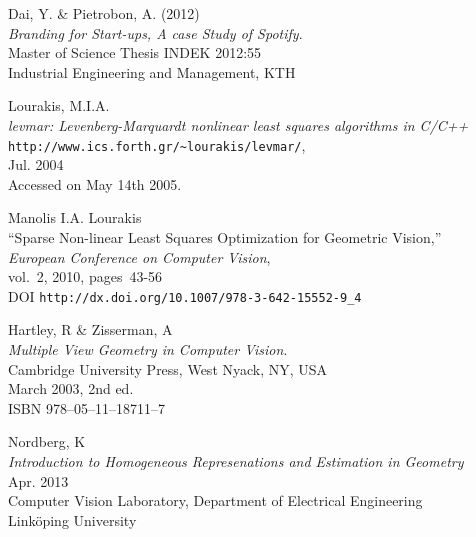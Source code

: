 \begin{thebibliography}{9}

	Dai, Y. \& Pietrobon, A. (2012)\\
	\emph{Branding for Start-ups, A case Study of Spotify}.\\
	Master of Science Thesis INDEK 2012:55 \\
	Industrial Engineering and Management, KTH
	

    Lourakis, M.I.A.\\
   \emph{levmar: Levenberg-Marquardt nonlinear least squares algorithms in {C}/{C}++}\\
     \verb+http://www.ics.forth.gr/~lourakis/levmar/+,\\
    Jul. 2004\\
    Accessed on May 14th 2005.
    
    Manolis I.A. Lourakis\\
   ``Sparse Non-linear Least Squares Optimization for Geometric Vision,''\\
    \emph{European Conference on Computer Vision},\\
    vol.~2, 2010,
    pages~43-56 \\
    DOI \verb+http://dx.doi.org/10.1007/978-3-642-15552-9_4+

	Hartley, R \& Zisserman, A\\
	\emph{Multiple View Geometry in Computer Vision}.\\
	Cambridge University Press, West Nyack, NY, USA \\
	March 2003, 2nd ed.\\
	ISBN 978--05--11--18711--7
	
	Nordberg, K\\
	\emph{Introduction to Homogeneous Represenations and Estimation in Geometry}\\
	Apr. 2013\\
	Computer Vision Laboratory,	Department of Electrical Engineering\\
	Linköping University

\end{thebibliography}